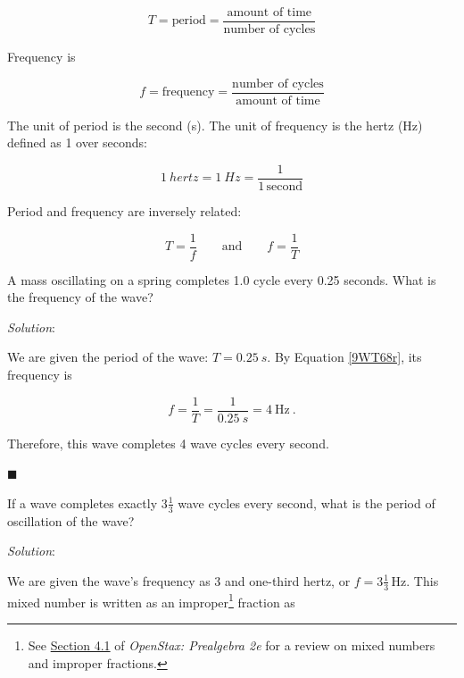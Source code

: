 \documentclass[dvipsnames]{article}
\begin{document}
\begin{equation}
    T = \text{period} = \frac{\text{amount of time}}{\text{number of cycles}}
\end{equation}

Frequency is

\begin{equation}
    f = \text{frequency} = \frac{\text{number of cycles}}{\text{amount of time}}
\end{equation}

The unit of period is the second (s). The unit of frequency is the hertz (Hz) defined as 1 over seconds:

\begin{equation*}
    \SI{1}{hertz} = \SI{1}{Hz} = \frac{1}{1\,\text{second}}
\end{equation*}

Period and frequency are inversely related:

\begin{equation}
    T = \frac{1}{f} \qquad \text{and} \qquad f = \frac{1}{T}
\end{equation}

\begin{example}
    A mass oscillating on a spring completes 1.0 cycle every 0.25 seconds. What is the frequency of the wave?
\end{example}

\textit{Solution}: 

We are given the period of the wave: $T = \SI{0.25}{s}$. By Equation \ref{9WT68r}, its frequency is

\begin{equation*}
    f = \frac{1}{T} = \frac{1}{\SI{0.25}{s}} = \SI{4}{\Hz}\ .
\end{equation*}

Therefore, this wave completes 4 wave cycles every second.

\hfill $\blacksquare$

\begin{example}
    If a wave completes exactly $3 \frac{1}{3}$ wave cycles every second, what is the period of oscillation of the wave? 
\end{example}

\textit{Solution}: 

We are given the wave's frequency as 3 and one-third hertz, or $f = 3\frac{1}{3}\,\text{Hz}$. This mixed number is written as an improper\footnote{See \href{https://openstax.org/books/prealgebra-2e/pages/4-1-visualize-fractions}{Section 4.1} of \textit{OpenStax: Prealgebra 2e} for a review on mixed numbers and improper fractions.} fraction as
\end{document}
